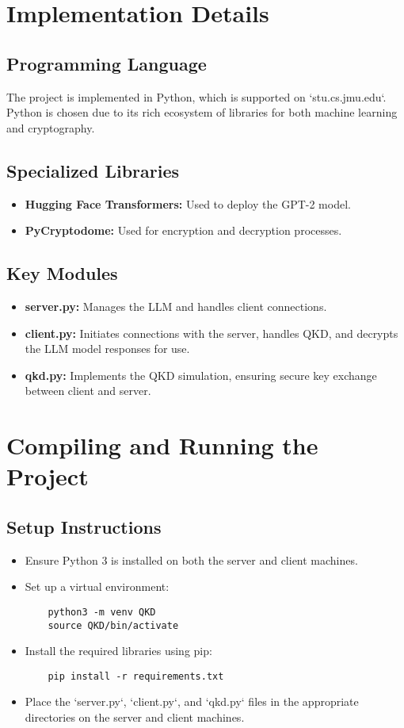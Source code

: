 \documentclass{article}
\begin{document}
\section{Implementation Details}

\subsection{Programming Language}
The project is implemented in Python, which is supported on `stu.cs.jmu.edu`. Python is chosen due to its rich ecosystem of libraries for both machine learning and cryptography.

\subsection{Specialized Libraries}
\begin{itemize}
    \item \textbf{Hugging Face Transformers:} Used to deploy the GPT-2 model.
    \item \textbf{PyCryptodome:} Used for encryption and decryption processes.
\end{itemize}

\subsection{Key Modules}
\begin{itemize}
    \item \textbf{server.py:} Manages the LLM and handles client connections.
    \item \textbf{client.py:} Initiates connections with the server, handles QKD, and decrypts the LLM model responses for use.
    \item \textbf{qkd.py:} Implements the QKD simulation, ensuring secure key exchange between client and server.
\end{itemize}

\section{Compiling and Running the Project}

\subsection{Setup Instructions}
\begin{itemize}
    \item Ensure Python 3 is installed on both the server and client machines.
    \item Set up a virtual environment:
    \begin{verbatim}
    python3 -m venv QKD
    source QKD/bin/activate
    \end{verbatim}
    \item Install the required libraries using pip:
    \begin{verbatim}
    pip install -r requirements.txt
    \end{verbatim}
    \item Place the `server.py`, `client.py`, and `qkd.py` files in the appropriate directories on the server and client machines.
\end{itemize}
\end{document}
